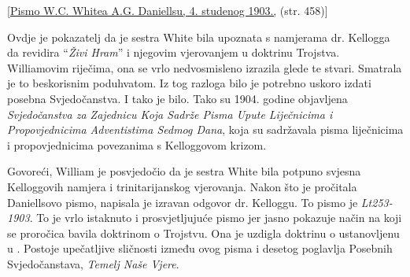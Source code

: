 [\href{https://ellenwhite.org/letterbooks/555}{Pismo W.C. Whitea A.G. Daniellsu, 4. studenog 1903.,} (str. 458)]

Ovdje je pokazatelj da je sestra White bila upoznata s namjerama dr. Kellogga da revidira “\textit{Živi Hram}” i njegovim vjerovanjem u doktrinu Trojstva. Williamovim riječima, ona se vrlo nedvosmisleno izrazila glede te stvari. Smatrala je to beskorisnim poduhvatom. Iz tog razloga bilo je potrebno uskoro izdati posebna Svjedočanstva. I tako je bilo. Tako su 1904. godine objavljena \textit{Svjedočanstva za Zajednicu Koja Sadrže Pisma Upute Liječnicima i Propovjednicima Adventistima Sedmog Dana}, koja su sadržavala pisma liječnicima i propovjednicima povezanima s Kelloggovom krizom.

Govoreći, William je posvjedočio da je sestra White bila potpuno svjesna Kelloggovih namjera i trinitarijanskog vjerovanja. Nakon što je pročitala Daniellsovo pismo, napisala je izravan odgovor dr. Kelloggu. To pismo je \textit{Lt253-1903}. To je vrlo istaknuto i prosvjetljujuće pismo jer jasno pokazuje način na koji se proročica bavila doktrinom o Trojstvu. Ona je uzdigla doktrinu o  ustanovljenu u . Postoje upečatljive sličnosti između ovog pisma i desetog poglavlja Posebnih Svjedočanstava, \textit{Temelj Naše Vjere}.

